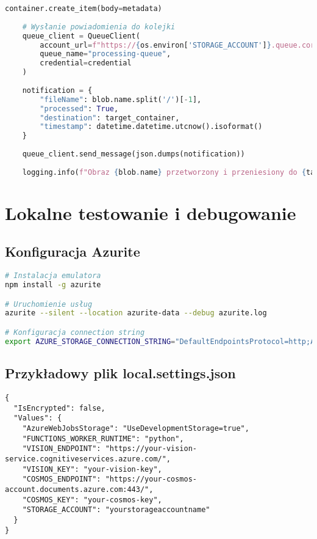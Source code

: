 \documentclass{article}
\begin{document}
\begin{lstlisting}[language=python]
    container.create_item(body=metadata)
    
    # Wysłanie powiadomienia do kolejki
    queue_client = QueueClient(
        account_url=f"https://{os.environ['STORAGE_ACCOUNT']}.queue.core.windows.net",
        queue_name="processing-queue",
        credential=credential
    )
    
    notification = {
        "fileName": blob.name.split('/')[-1],
        "processed": True,
        "destination": target_container,
        "timestamp": datetime.datetime.utcnow().isoformat()
    }
    
    queue_client.send_message(json.dumps(notification))
    
    logging.info(f"Obraz {blob.name} przetworzony i przeniesiony do {target_container}")
\end{lstlisting}

\section{Lokalne testowanie i debugowanie}
\subsection{Konfiguracja Azurite}
\begin{lstlisting}[language=bash]
# Instalacja emulatora
npm install -g azurite

# Uruchomienie usług
azurite --silent --location azurite-data --debug azurite.log

# Konfiguracja connection string
export AZURE_STORAGE_CONNECTION_STRING="DefaultEndpointsProtocol=http;AccountName=devstoreaccount1;AccountKey=Eby8vdM02xNOcqFlqUwJPLlmEtlCDXJ1OUzFT50uSRZ6IFsuFq2UVErCz4I6tq/K1SZFPTOtr/KBHBeksoGMGw==;BlobEndpoint=http://127.0.0.1:10000/devstoreaccount1;"
\end{lstlisting}

\subsection{Przykładowy plik local.settings.json}
\begin{lstlisting}[]
{
  "IsEncrypted": false,
  "Values": {
    "AzureWebJobsStorage": "UseDevelopmentStorage=true",
    "FUNCTIONS_WORKER_RUNTIME": "python",
    "VISION_ENDPOINT": "https://your-vision-service.cognitiveservices.azure.com/",
    "VISION_KEY": "your-vision-key",
    "COSMOS_ENDPOINT": "https://your-cosmos-account.documents.azure.com:443/",
    "COSMOS_KEY": "your-cosmos-key",
    "STORAGE_ACCOUNT": "yourstorageaccountname"
  }
}
\end{lstlisting}
\end{document}
